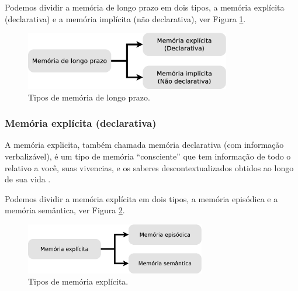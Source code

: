 Podemos dividir a memória de longo prazo em dois tipos, 
a memória explícita (declarativa) e 
a memória implícita (não declarativa), ver Figura \ref{fig:implicito-explicito}.
\begin{figure}[!h]
  \centering
    \includegraphics[width=0.8\textwidth]{chapters/cap-learning/memory-mlp.eps} 
  \caption{Tipos de  memória de longo prazo.}
\label{fig:implicito-explicito}
\end{figure}

\subsubsection{Memória explícita (declarativa)} 
\label{subsubsec:explicita}
A memória explicita, também chamada memória declarativa (com informação verbalizável),
é um tipo de memória ``consciente'' que tem informação de todo o relativo a você, 
suas vivencias, e os saberes descontextualizados obtidos ao longo de sua vida
\cite[pp. 138]{pake2019psicologia}.

Podemos dividir a memória explícita em dois tipos, 
a memória episódica e 
a memória semântica, ver Figura \ref{fig:semantica-episodica:explicita}.
\begin{figure}[!h]
  \centering
    \includegraphics[width=0.7\textwidth]{chapters/cap-learning/memory-explicita.eps} 
  \caption{Tipos de  memória explícita.}
\label{fig:semantica-episodica:explicita}
\end{figure}

